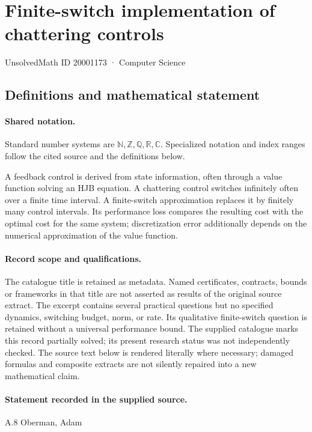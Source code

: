\documentclass[11pt]{article}
\begin{document}
\setcounter{section}{20001172}
\section{Finite-switch implementation of chattering controls}\label{20001173}
{\small\sffamily UnsolvedMath ID 20001173 · Computer Science}
\subsection{Definitions and mathematical statement}

\paragraph{Shared notation.}Standard number systems are $\mathbb N,\mathbb Z,\mathbb Q,\mathbb R,\mathbb C$. Specialized notation and index ranges follow the cited source and the definitions below.


A feedback control is derived from state information, often through a value function solving an HJB equation. A chattering control switches infinitely often over a finite time interval. A finite-switch approximation replaces it by finitely many control intervals. Its performance loss compares the resulting cost with the optimal cost for the same system; discretization error additionally depends on the numerical approximation of the value function.
\paragraph{Record scope and qualifications.}
The catalogue title is retained as metadata. Named certificates, contracts, bounds or frameworks in that title are not asserted as results of the original source extract.
The excerpt contains several practical questions but no specified dynamics, switching budget, norm, or rate. Its qualitative finite-switch question is retained without a universal performance bound. The supplied catalogue marks this record partially solved; its present research status was not independently checked.
The source text below is rendered literally where necessary; damaged formulas and composite extracts are not silently repaired into a new mathematical claim.
\paragraph{Statement recorded in the supplied source.}
A.8 Oberman, Adam
\end{document}
